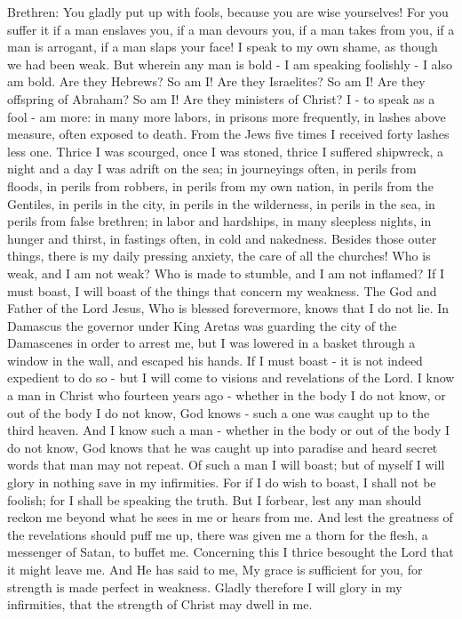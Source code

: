 {{Brethren: You gladly put up with fools, because you are wise yourselves! For you suffer it if a man enslaves you, if a man devours you, if a man takes from you, if a man is arrogant, if a man slaps your face! I speak to my own shame, as though we had been weak. But wherein any man is bold - I am speaking foolishly - I also am bold. Are they Hebrews? So am I! Are they Israelites? So am I! Are they offspring of Abraham? So am I! Are they ministers of Christ? I - to speak as a fool - am more: in many more labors, in prisons more frequently, in lashes above measure, often exposed to death. From the Jews five times I received forty lashes less one. Thrice I was scourged, once I was stoned, thrice I suffered shipwreck, a night and a day I was adrift on the sea; in journeyings often, in perils from floods, in perils from robbers, in perils from my own nation, in perils from the Gentiles, in perils in the city, in perils in the wilderness, in perils in the sea, in perils from false brethren; in labor and hardships, in many sleepless nights, in hunger and thirst, in fastings often, in cold and nakedness. Besides those outer things, there is my daily pressing anxiety, the care of all the churches! Who is weak, and I am not weak? Who is made to stumble, and I am not inflamed? If I must boast, I will boast of the things that concern my weakness. The God and Father of the Lord Jesus, Who is blessed forevermore, knows that I do not lie. In Damascus the governor under King Aretas was guarding the city of the Damascenes in order to arrest me, but I was lowered in a basket through a window in the wall, and escaped his hands. If I must boast - it is not indeed expedient to do so - but I will come to visions and revelations of the Lord. I know a man in Christ who fourteen years ago - whether in the body I do not know, or out of the body I do not know, God knows - such a one was caught up to the third heaven. And I know such a man - whether in the body or out of the body I do not know, God knows that he was caught up into paradise and heard secret words that man may not repeat. Of such a man I will boast; but of myself I will glory in nothing save in my infirmities. For if I do wish to boast, I shall not be foolish; for I shall be speaking the truth. But I forbear, lest any man should reckon me beyond what he sees in me or hears from me. And lest the greatness of the revelations should puff me up, there was given me a thorn for the flesh, a messenger of Satan, to buffet me. Concerning this I thrice besought the Lord that it might leave me. And He has said to me, My grace is sufficient for you, for strength is made perfect in weakness. Gladly therefore I will glory in my infirmities, that the strength of Christ may dwell in me.
  }
}

